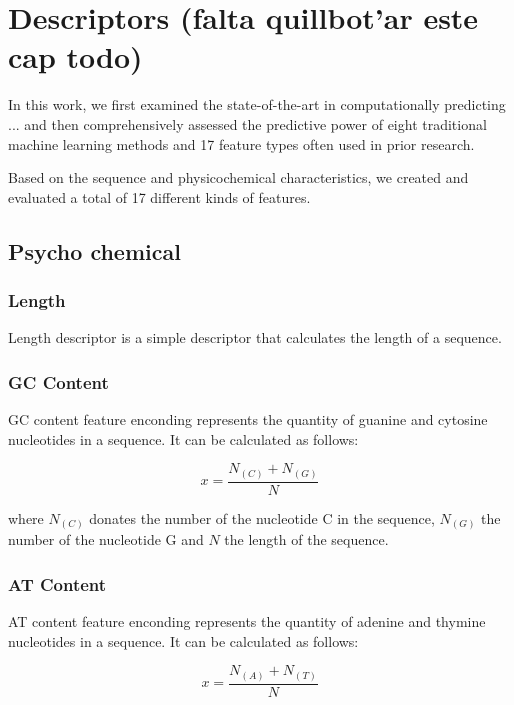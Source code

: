 \chapter{Descriptors (falta quillbot'ar este cap todo)}
\label{cha:descriptors}

In this work, we first examined the state-of-the-art in computationally predicting ... and then comprehensively assessed the predictive power of eight traditional machine learning methods and 17 feature types often used in prior research.

Based on the sequence and physicochemical characteristics, we created and evaluated a total of 17 different kinds of features.

\section{Psycho chemical}

\subsection{Length}

Length descriptor is a simple descriptor that calculates the length of a sequence.

\subsection{GC Content}

\gls{GC} content feature enconding represents the quantity of guanine and cytosine nucleotides in a sequence. It can be calculated as follows:

\begin{equation}\label{eq:gc_content}
    x = \frac{N_{(C)} + N_{(G)}}{N}
\end{equation}


where $N_{(C)}$ donates the number of the nucleotide C in the sequence, $N_{(G)}$ the number of the nucleotide G and $N$ the length of the sequence.

\subsection{AT Content}

\gls{AT} content feature enconding represents the quantity of adenine and thymine nucleotides in a sequence. It can be calculated as follows:


\begin{equation}\label{eq:at_content}
    x = \frac{N_{(A)} + N_{(T)}}{N}
\end{equation}

